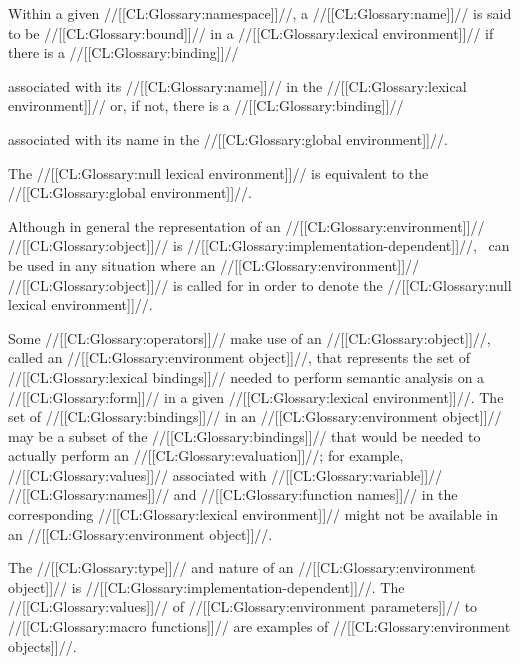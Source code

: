 Within a given //[[CL:Glossary:namespace]]//, a //[[CL:Glossary:name]]// is said to be //[[CL:Glossary:bound]]// in a //[[CL:Glossary:lexical environment]]// if there is a //[[CL:Glossary:binding]]// 

associated with its //[[CL:Glossary:name]]// in the //[[CL:Glossary:lexical environment]]// or, if not, there is a //[[CL:Glossary:binding]]// 

associated with its name in the //[[CL:Glossary:global environment]]//.

 

The //[[CL:Glossary:null lexical environment]]// is equivalent to the //[[CL:Glossary:global environment]]//.

Although in general the representation of an //[[CL:Glossary:environment]]// //[[CL:Glossary:object]]// is //[[CL:Glossary:implementation-dependent]]//, \nil\ can be used in any situation where an //[[CL:Glossary:environment]]// //[[CL:Glossary:object]]// is called for in order to denote  the //[[CL:Glossary:null lexical environment]]//.

\endsubsubsubsection%

\endsubsubsection%

 

Some //[[CL:Glossary:operators]]// make use of an //[[CL:Glossary:object]]//,  called an //[[CL:Glossary:environment object]]//, that represents the set of //[[CL:Glossary:lexical bindings]]// needed to perform semantic analysis on a //[[CL:Glossary:form]]// in a given //[[CL:Glossary:lexical environment]]//. The set of //[[CL:Glossary:bindings]]// in an //[[CL:Glossary:environment object]]// may be a subset of the //[[CL:Glossary:bindings]]// that would be needed to actually  perform an //[[CL:Glossary:evaluation]]//; for example, //[[CL:Glossary:values]]// associated with //[[CL:Glossary:variable]]// //[[CL:Glossary:names]]// and //[[CL:Glossary:function names]]// in the corresponding //[[CL:Glossary:lexical environment]]// might not be available in an //[[CL:Glossary:environment object]]//.

The //[[CL:Glossary:type]]// and nature of an //[[CL:Glossary:environment object]]// is //[[CL:Glossary:implementation-dependent]]//. The //[[CL:Glossary:values]]// of //[[CL:Glossary:environment parameters]]// to //[[CL:Glossary:macro functions]]// are examples of //[[CL:Glossary:environment objects]]//.

